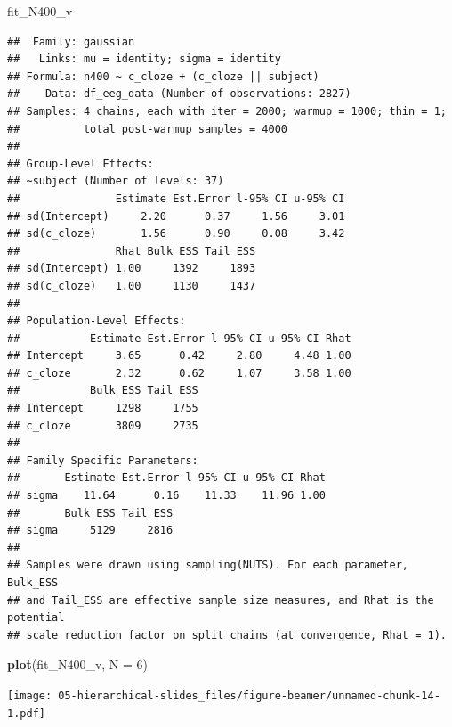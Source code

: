 \documentclass[12pt,ignorenonframetext,aspectratio=169]{beamer}
\newenvironment{Shaded}{\begin{snugshade}}{\end{snugshade}}
\newcommand{\DataTypeTok}[1]{\textcolor[rgb]{0.13,0.29,0.53}{#1}}
\newcommand{\DecValTok}[1]{\textcolor[rgb]{0.00,0.00,0.81}{#1}}
\newcommand{\KeywordTok}[1]{\textcolor[rgb]{0.13,0.29,0.53}{\textbf{#1}}}
\newcommand{\NormalTok}[1]{#1}
\begin{document}
\begin{frame}[fragile]

\vspace{.1in}

\scriptsize

\begin{Shaded}
\begin{Highlighting}[]
\NormalTok{fit_N400_v}
\end{Highlighting}
\end{Shaded}

\begin{verbatim}
##  Family: gaussian 
##   Links: mu = identity; sigma = identity 
## Formula: n400 ~ c_cloze + (c_cloze || subject) 
##    Data: df_eeg_data (Number of observations: 2827) 
## Samples: 4 chains, each with iter = 2000; warmup = 1000; thin = 1;
##          total post-warmup samples = 4000
## 
## Group-Level Effects: 
## ~subject (Number of levels: 37) 
##               Estimate Est.Error l-95% CI u-95% CI
## sd(Intercept)     2.20      0.37     1.56     3.01
## sd(c_cloze)       1.56      0.90     0.08     3.42
##               Rhat Bulk_ESS Tail_ESS
## sd(Intercept) 1.00     1392     1893
## sd(c_cloze)   1.00     1130     1437
## 
## Population-Level Effects: 
##           Estimate Est.Error l-95% CI u-95% CI Rhat
## Intercept     3.65      0.42     2.80     4.48 1.00
## c_cloze       2.32      0.62     1.07     3.58 1.00
##           Bulk_ESS Tail_ESS
## Intercept     1298     1755
## c_cloze       3809     2735
## 
## Family Specific Parameters: 
##       Estimate Est.Error l-95% CI u-95% CI Rhat
## sigma    11.64      0.16    11.33    11.96 1.00
##       Bulk_ESS Tail_ESS
## sigma     5129     2816
## 
## Samples were drawn using sampling(NUTS). For each parameter, Bulk_ESS
## and Tail_ESS are effective sample size measures, and Rhat is the potential
## scale reduction factor on split chains (at convergence, Rhat = 1).
\end{verbatim}

\normalsize

\end{frame}

\begin{frame}[fragile]

\small

\begin{Shaded}
\begin{Highlighting}[]
\KeywordTok{plot}\NormalTok{(fit_N400_v, }\DataTypeTok{N =} \DecValTok{6}\NormalTok{)}
\end{Highlighting}
\end{Shaded}

\texttt{[image: 05-hierarchical-slides\_files/figure-beamer/unnamed-chunk-14-1.pdf]}

\normalsize

\end{frame}
\end{document}
